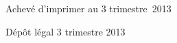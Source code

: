 \cleardoublepage
\mbox{}
\vfill

{\scriptsize
\begin{center}
Achevé d'imprimer au 3 trimestre~2013

Dépôt légal\frcolon{} 3 trimestre 2013
\end{center}
}
\enlargethispage{\footskip}


